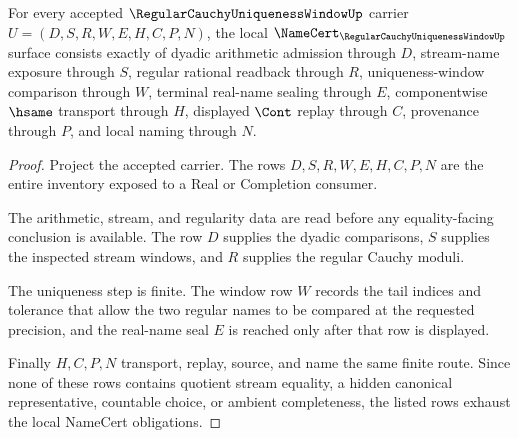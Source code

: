 \begin{theorem}
\label{thm:regular-cauchy-uniqueness-window-namecert-obligations}
For every accepted $\RegularCauchyUniquenessWindowUp$ carrier $U=(D,S,R,W,E,H,C,P,N)$, the local $\NameCert_{\RegularCauchyUniquenessWindowUp}$ surface consists exactly of dyadic arithmetic admission through $D$, stream-name exposure through $S$, regular rational readback through $R$, uniqueness-window comparison through $W$, terminal real-name sealing through $E$, componentwise $\hsame$ transport through $H$, displayed $\Cont$ replay through $C$, provenance through $P$, and local naming through $N$.
\end{theorem}
\begin{proof}
Project the accepted carrier. The rows $D,S,R,W,E,H,C,P,N$ are the entire inventory exposed to a Real or Completion consumer.

The arithmetic, stream, and regularity data are read before any equality-facing conclusion is available. The row $D$ supplies the dyadic comparisons, $S$ supplies the inspected stream windows, and $R$ supplies the regular Cauchy moduli.

The uniqueness step is finite. The window row $W$ records the tail indices and tolerance that allow the two regular names to be compared at the requested precision, and the real-name seal $E$ is reached only after that row is displayed.

Finally $H,C,P,N$ transport, replay, source, and name the same finite route. Since none of these rows contains quotient stream equality, a hidden canonical representative, countable choice, or ambient completeness, the listed rows exhaust the local NameCert obligations.
\end{proof}

